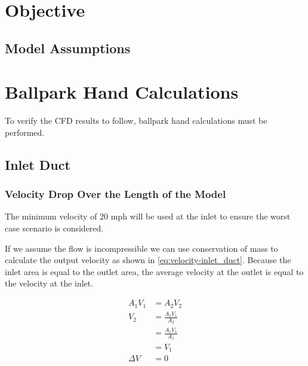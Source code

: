 \documentclass{article}
\begin{document}
\newcommand{\titleName}{Midterm - Design of a Heat Exchanger}
\newcommand{\courseName}{ME-407: Computational Fluid Dynamics}
\newcommand{\dateCreated}{\today}
\newcommand{\professorName}{Professor Bondi}



\section{Objective}


\subsection{Model Assumptions}


\section{Ballpark Hand Calculations}
To verify the CFD results to follow, ballpark hand calculations must be performed.


\subsection{Inlet Duct}


\subsubsection{Velocity Drop Over the Length of the Model}
The minimum velocity of 20 mph will be used at the inlet to ensure the worst case scenario is considered.

If we assume the flow is incompressible we can use conservation of mass to calculate the output velocity as shown in \autoref{eq:velocity-inlet_duct}. Because the inlet area is equal to the outlet area, the average velocity at the outlet is equal to the velocity at the inlet.

\begin{equation}
	\begin{aligned}
		A_1 V_1  & = A_2 V_2             \\
		V_2      & = \frac{A_1 V_1}{A_2} \\
		         & = \frac{A_1 V_1}{A_1} \\
		         & = V_1                 \\
		\Delta V & = 0
	\end{aligned}
	\label{eq:velocity-inlet_duct}
\end{equation}
\end{document}
